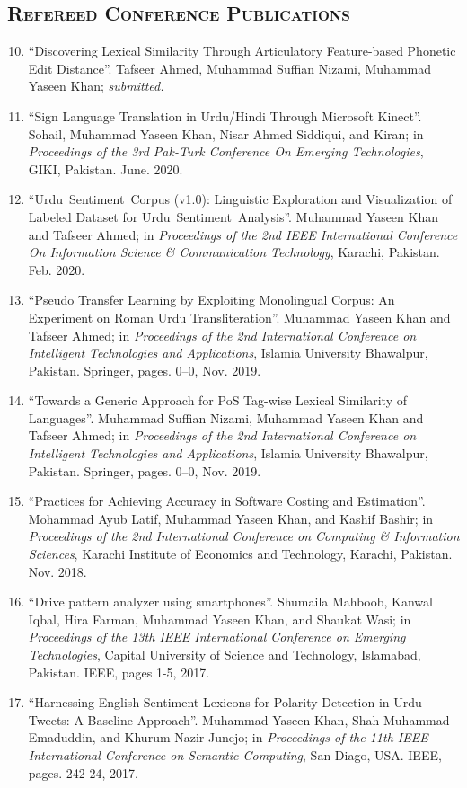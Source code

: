 \documentclass[a4paper, 10pt]{article}
\begin{document}
\subsection*{\normalfont\textsc{Refereed Conference Publications}}
\begin{enumerate}
\setcounter{enumi}{9}
\itemsep-4pt 
\item ``Discovering Lexical Similarity Through Articulatory Feature-based Phonetic Edit Distance''. Tafseer Ahmed, Muhammad Suffian Nizami, Muhammad Yaseen Khan; \emph{\small submitted.}

\item ``Sign Language Translation in Urdu/Hindi Through Microsoft Kinect''. Sohail, Muhammad Yaseen Khan, Nisar Ahmed Siddiqui, and Kiran; in \emph{Proceedings of the 3rd Pak-Turk Conference On Emerging Technologies}, GIKI, Pakistan. June. 2020.

\item ``Urdu~Sentiment~Corpus (v1.0): Linguistic Exploration and Visualization of Labeled Dataset for Urdu~Sentiment~Analysis''. Muhammad Yaseen Khan and Tafseer Ahmed; in \emph{Proceedings of the 2nd IEEE International Conference On Information Science \& Communication Technology}, Karachi, Pakistan. Feb. 2020.

 \item ``Pseudo Transfer Learning by Exploiting Monolingual Corpus: An Experiment on Roman Urdu Transliteration''. Muhammad Yaseen Khan and Tafseer Ahmed; in \emph{Proceedings of the 2nd International Conference on Intelligent Technologies and Applications}, Islamia University Bhawalpur, Pakistan. Springer,  pages. 0--0, Nov. 2019.
 
  \item ``Towards a Generic Approach for PoS Tag-wise Lexical Similarity of Languages''. Muhammad Suffian Nizami, Muhammad Yaseen Khan and Tafseer Ahmed; in \emph{Proceedings of the 2nd International Conference on Intelligent Technologies and Applications}, Islamia University Bhawalpur, Pakistan. Springer,  pages. 0--0, Nov. 2019.
  
  \item ``Practices for Achieving Accuracy in Software Costing and Estimation''. Mohammad Ayub Latif, Muhammad Yaseen Khan, and Kashif Bashir; in \emph{Proceedings of the 2nd International Conference on Computing \& Information Sciences}, Karachi Institute of Economics and Technology, Karachi, Pakistan. Nov. 2018.
  
  \item ``Drive pattern analyzer using smartphones''. Shumaila Mahboob, Kanwal Iqbal, Hira Farman, Muhammad Yaseen Khan, and Shaukat Wasi; in \emph{ Proceedings of the 13th IEEE International Conference on Emerging Technologies}, Capital University of Science and Technology, Islamabad, Pakistan. IEEE, pages 1-5, 2017.
  
  \item ``Harnessing English Sentiment Lexicons for Polarity Detection in Urdu Tweets: A Baseline Approach''. Muhammad Yaseen Khan, Shah Muhammad Emaduddin, and Khurum Nazir Junejo;  in \emph{Proceedings of the 11th IEEE International Conference on Semantic Computing}, San Diago, USA. IEEE, pages. 242-24, 2017.
\end{enumerate}
\end{document}

